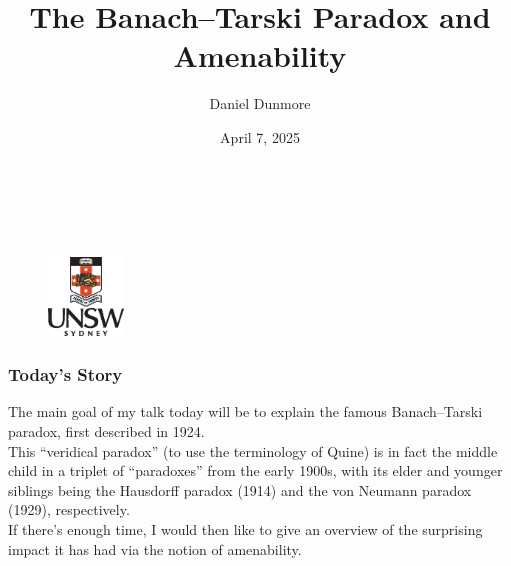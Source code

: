 \documentclass{beamer}
\title[The Banach--Tarski Paradox and Amenability]{The Banach--Tarski Paradox and Amenability}
\author{Daniel Dunmore}
\institute[UNSW]{
	University of New South Wales \\
	\medskip
	\textit{d.dunmore@unsw.edu.au}
}
\date{April 7, 2025}
\theoremstyle{example}
\begin{document}

\begin{frame}
\noindent\\[-20pt]
\begin{figure}[!ht]
\titlepage
\noindent\\[-20pt]
\hspace{3.5cm}\hfill\includegraphics[width=2cm]{unsw-crest}\hfill{}
\end{figure}
\end{frame}

\begin{frame}
\frametitle{Today's Story}
\noindent The main goal of my talk today will be to explain the famous Banach--Tarski paradox, first described in 1924.\\[\baselineskip]%

\noindent This ``veridical paradox'' (to use the terminology of Quine) is in fact the middle child in a triplet of ``paradoxes'' from the early 1900s, with its elder and younger siblings being the Hausdorff paradox (1914) and the von Neumann paradox (1929), respectively.\\[\baselineskip]%

\noindent If there's enough time, I would then like to give an overview of the surprising impact it has had via the notion of amenability.
\end{frame}

\end{document}
